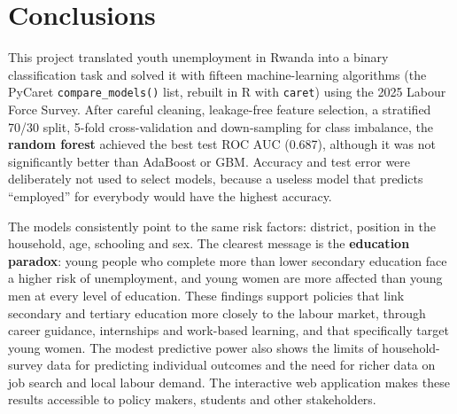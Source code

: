 \documentclass[11pt,a4paper]{article}
\begin{document}
\section{Conclusions}
This project translated youth unemployment in Rwanda into a binary classification task and solved it
with fifteen machine-learning algorithms (the PyCaret \texttt{compare\_models()} list, rebuilt in R
with \texttt{caret}) using the 2025 Labour Force Survey. After careful cleaning,
leakage-free feature selection, a stratified 70/30 split, 5-fold cross-validation and down-sampling
for class imbalance, the \textbf{random forest} achieved the best test ROC AUC (0.687), although it was
not significantly better than AdaBoost or GBM. Accuracy and test error were deliberately not used to
select models, because a useless model that predicts ``employed'' for everybody would have the highest
accuracy.

The models consistently point to the same risk factors: district, position in the household, age,
schooling and sex. The clearest message is the \textbf{education paradox}: young people who complete
more than lower secondary education face a higher risk of unemployment, and young women are more
affected than young men at every level of education. These findings support policies that link
secondary and tertiary education more closely to the labour market, through career guidance,
internships and work-based learning, and that specifically target young women. The modest predictive
power also shows the limits of household-survey data for predicting individual outcomes and the need
for richer data on job search and local labour demand. The interactive web application makes these
results accessible to policy makers, students and other stakeholders.
\end{document}
